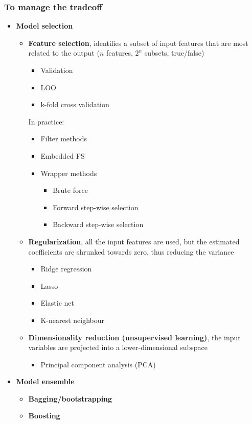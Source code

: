 \subsubsection{To manage the tradeoff}
    \begin{itemize}
        \item \textbf{Model selection}
        \begin{itemize}
            \item \textbf{Feature selection}, identifies a subset of input features that are most related to the output ($n$ features, $2^n$ subsets, true/false)
            \begin{itemize}
                \item Validation
                \item LOO
                \item k-fold cross validation
            \end{itemize}
            In practice:
            \begin{itemize}
                \item Filter methods
                \item Embedded FS
                \item Wrapper methods
                \begin{itemize}
                    \item Brute force
                    \item Forward step-wise selection
                    \item Backward step-wise selection
                \end{itemize}
            \end{itemize}
            \item \textbf{Regularization}, all the input features are used, but the estimated coefficients are shrunked towards zero, thus reducing the variance
            \begin{itemize}
                \item Ridge regression
                \item Lasso
                \item Elastic net
                \item K-nearest neighbour
            \end{itemize}
            \item \textbf{Dimensionality reduction (unsupervised learning)}, the input variables are projected into a lower-dimensional subspace
            \begin{itemize}
                \item Principal component analysis (PCA)
            \end{itemize}
        \end{itemize}
        \item \textbf{Model ensemble}
        \begin{itemize}
            \item \textbf{Bagging/bootstrapping}
            \item \textbf{Boosting}
        \end{itemize}
    \end{itemize}
